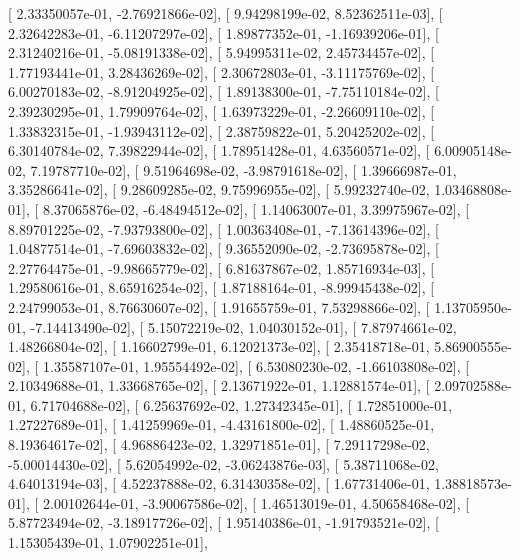 \documentclass{article}
\begin{document}
       [  2.33350057e-01,  -2.76921866e-02],
       [  9.94298199e-02,   8.52362511e-03],
       [  2.32642283e-01,  -6.11207297e-02],
       [  1.89877352e-01,  -1.16939206e-01],
       [  2.31240216e-01,  -5.08191338e-02],
       [  5.94995311e-02,   2.45734457e-02],
       [  1.77193441e-01,   3.28436269e-02],
       [  2.30672803e-01,  -3.11175769e-02],
       [  6.00270183e-02,  -8.91204925e-02],
       [  1.89138300e-01,  -7.75110184e-02],
       [  2.39230295e-01,   1.79909764e-02],
       [  1.63973229e-01,  -2.26609110e-02],
       [  1.33832315e-01,  -1.93943112e-02],
       [  2.38759822e-01,   5.20425202e-02],
       [  6.30140784e-02,   7.39822944e-02],
       [  1.78951428e-01,   4.63560571e-02],
       [  6.00905148e-02,   7.19787710e-02],
       [  9.51964698e-02,  -3.98791618e-02],
       [  1.39666987e-01,   3.35286641e-02],
       [  9.28609285e-02,   9.75996955e-02],
       [  5.99232740e-02,   1.03468808e-01],
       [  8.37065876e-02,  -6.48494512e-02],
       [  1.14063007e-01,   3.39975967e-02],
       [  8.89701225e-02,  -7.93793800e-02],
       [  1.00363408e-01,  -7.13614396e-02],
       [  1.04877514e-01,  -7.69603832e-02],
       [  9.36552090e-02,  -2.73695878e-02],
       [  2.27764475e-01,  -9.98665779e-02],
       [  6.81637867e-02,   1.85716934e-03],
       [  1.29580616e-01,   8.65916254e-02],
       [  1.87188164e-01,  -8.99945438e-02],
       [  2.24799053e-01,   8.76630607e-02],
       [  1.91655759e-01,   7.53298866e-02],
       [  1.13705950e-01,  -7.14413490e-02],
       [  5.15072219e-02,   1.04030152e-01],
       [  7.87974661e-02,   1.48266804e-02],
       [  1.16602799e-01,   6.12021373e-02],
       [  2.35418718e-01,   5.86900555e-02],
       [  1.35587107e-01,   1.95554492e-02],
       [  6.53080230e-02,  -1.66103808e-02],
       [  2.10349688e-01,   1.33668765e-02],
       [  2.13671922e-01,   1.12881574e-01],
       [  2.09702588e-01,   6.71704688e-02],
       [  6.25637692e-02,   1.27342345e-01],
       [  1.72851000e-01,   1.27227689e-01],
       [  1.41259969e-01,  -4.43161800e-02],
       [  1.48860525e-01,   8.19364617e-02],
       [  4.96886423e-02,   1.32971851e-01],
       [  7.29117298e-02,  -5.00014430e-02],
       [  5.62054992e-02,  -3.06243876e-03],
       [  5.38711068e-02,   4.64013194e-03],
       [  4.52237888e-02,   6.31430358e-02],
       [  1.67731406e-01,   1.38818573e-01],
       [  2.00102644e-01,  -3.90067586e-02],
       [  1.46513019e-01,   4.50658468e-02],
       [  5.87723494e-02,  -3.18917726e-02],
       [  1.95140386e-01,  -1.91793521e-02],
       [  1.15305439e-01,   1.07902251e-01],
\end{document}
